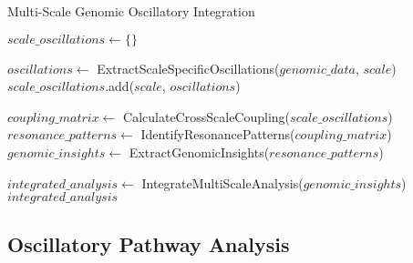 \documentclass[12pt,a4paper]{article}
\begin{document}
\begin{algorithm}
\caption{Multi-Scale Genomic Oscillatory Integration}
\begin{algorithmic}
    \State $scale\_oscillations \gets \{\}$
    
        \State $oscillations \gets$ ExtractScaleSpecificOscillations($genomic\_data$, $scale$)
        \State $scale\_oscillations$.add($scale$, $oscillations$)
    \EndFor
    
    \State $coupling\_matrix \gets$ CalculateCrossScaleCoupling($scale\_oscillations$)
    \State $resonance\_patterns \gets$ IdentifyResonancePatterns($coupling\_matrix$)
    \State $genomic\_insights \gets$ ExtractGenomicInsights($resonance\_patterns$)
    
    \State $integrated\_analysis \gets$ IntegrateMultiScaleAnalysis($genomic\_insights$)
    \State \Return $integrated\_analysis$
\EndProcedure
\end{algorithmic}
\end{algorithm}

\subsection{Oscillatory Pathway Analysis}
\end{document}
